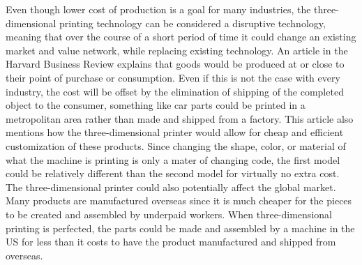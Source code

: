 \documentclass[pdftex,10.5pt]{report}
\begin{document}
 Even though lower cost of production is a goal for many industries, the three-dimensional printing technology can be considered a disruptive technology, meaning that over the course of a short period of time it could change an existing market and value network, while replacing existing technology. An article in the Harvard Business Review explains that goods would be produced at or close to their point of purchase or consumption. Even if this is not the case with every industry, the cost will be offset by the elimination of shipping of the completed object to the consumer, something like car parts could be printed in a metropolitan area rather than made and shipped from a factory. This article also mentions how the three-dimensional printer would allow for cheap and efficient customization of these products. Since changing the shape, color, or material of what the machine is printing is only a mater of changing code, the first model could be relatively different than the second model for virtually no extra cost. \cite{cite6} The three-dimensional printer could also potentially affect the global market. Many products are manufactured overseas since it is much cheaper for the pieces to be created and assembled by underpaid workers. When three-dimensional printing is perfected, the parts could be made and assembled by a machine in the US for less than it costs to have the product manufactured and shipped from overseas. 
\end{document}
